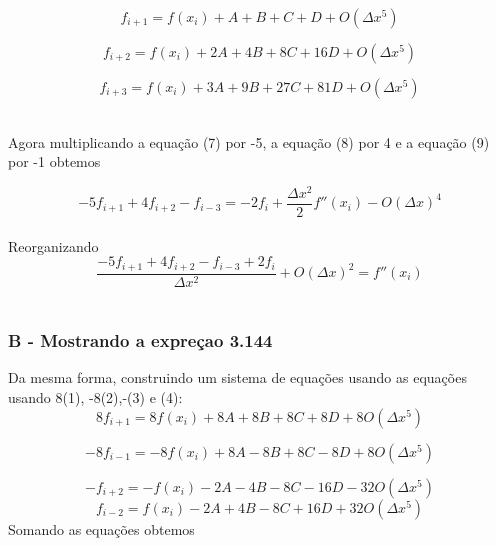 \documentclass[]{article}
\begin{document}
\begin{equation}
	f_{i+1}=f(x_{i}) + A + B + C + D + O(\Delta x^{5})
\end{equation}


\begin{equation}
	f_{i+2}=f(x_{i}) + 2A + 4B + 8C + 16D + O(\Delta x^{5})
\end{equation}

\begin{equation}
	f_{i+3}=f(x_{i}) + 3A + 9B + 27C + 81D + O(\Delta x^{5})
\end{equation}\\

\begin{flushleft}
	Agora multiplicando a equação (7) por -5, a equação (8) por 4 e a equação (9) por -1 obtemos
\end{flushleft}

\begin{equation}
	-5f_{i+1} + 4f_{i+2} -f_{i-3} = -2f_i +\frac{\Delta x^{2}}{2}f''(x_{i})- O(\Delta x)^{4}
\end{equation}\\

Reorganizando\\

\begin{equation}
	\frac{-5f_{i+1} + 4f_{i+2} -f_{i-3} + 2f_i}{\Delta x^{2}} +  O(\Delta x)^{2} = f''(x_{i})
\end{equation}\\

\subsubsection*{B - Mostrando a expreçao 3.144}
Da mesma forma, construindo um sistema de equações usando as equações usando 8(1), -8(2),-(3) e (4):\\

\begin{equation}
	8f_{i+1}=8f(x_{i}) + 8A + 8B + 8C + 8D + 8O(\Delta x^{5})
\end{equation}

\begin{equation}
	-8f_{i-1}=-8f(x_{i}) + 8A - 8B + 8C - 8D + 8O(\Delta x^{5})
\end{equation}

\begin{equation}
	-f_{i+2}=-f(x_{i}) - 2A - 4B - 8C - 16D - 32O(\Delta x^{5})
\end{equation}
\begin{equation}
	f_{i-2}=f(x_{i}) - 2A + 4B - 8C + 16D + 32O(\Delta x^{5})
\end{equation}
Somando as equações obtemos
\end{document}
